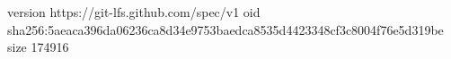 version https://git-lfs.github.com/spec/v1
oid sha256:5aeaca396da06236ca8d34e9753baedca8535d4423348cf3c8004f76e5d319be
size 174916
